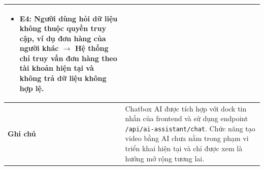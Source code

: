 \begin{longtable}{|p{3.5cm}|p{11cm}|}
\begin{itemize}
    \item E4: Người dùng hỏi dữ liệu không thuộc quyền truy cập, ví dụ đơn hàng của người khác $\rightarrow$ Hệ thống chỉ truy vấn đơn hàng theo tài khoản hiện tại và không trả dữ liệu không hợp lệ.
\end{itemize} \\ \hline
\textbf{Ghi chú} & Chatbox AI được tích hợp với dock tin nhắn của frontend và sử dụng endpoint \texttt{/api/ai-assistant/chat}. Chức năng tạo video bằng AI chưa nằm trong phạm vi triển khai hiện tại và chỉ được xem là hướng mở rộng tương lai. \\ \hline
\end{longtable}
\endgroup
